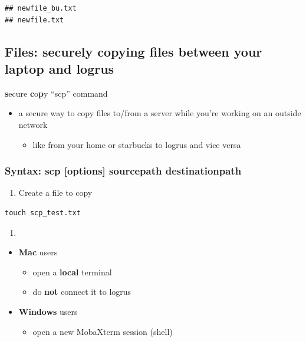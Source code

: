 \documentclass[
]{book}
\providecommand{\tightlist}{%
  \setlength{\itemsep}{0pt}\setlength{\parskip}{0pt}}
\begin{document}
\begin{verbatim}
## newfile_bu.txt
## newfile.txt
\end{verbatim}

\hypertarget{files-securely-copying-files-between-your-laptop-and-logrus}{%
\subsection{Files: securely copying files between your laptop and logrus}\label{files-securely-copying-files-between-your-laptop-and-logrus}}

\textbf{s}ecure \textbf{c}o\textbf{p}y ``scp'' command

\begin{itemize}
\tightlist
\item
  a secure way to copy files to/from a server while you're working on an outside network

  \begin{itemize}
  \tightlist
  \item
    like from your home or starbucks to logrus and vice versa
  \end{itemize}
\end{itemize}

\hypertarget{syntax-scp-options-sourcepath-destinationpath}{%
\subsubsection*{Syntax: scp {[}options{]} sourcepath destinationpath}\label{syntax-scp-options-sourcepath-destinationpath}}

\begin{enumerate}
\def\labelenumi{\arabic{enumi})}
\tightlist
\item
  Create a file to copy
\end{enumerate}

\begin{verbatim}
touch scp_test.txt
\end{verbatim}

\begin{enumerate}
\def\labelenumi{\arabic{enumi})}
\setcounter{enumi}{1}
\tightlist
\item
\end{enumerate}

\begin{itemize}
\tightlist
\item
  \textbf{Mac} users

  \begin{itemize}
  \tightlist
  \item
    open a \textbf{local} terminal
  \item
    do \textbf{not} connect it to logrus
  \end{itemize}
\item
  \textbf{Windows} users

  \begin{itemize}
  \tightlist
  \item
    open a new MobaXterm session (shell)
  \end{itemize}
\end{itemize}
\end{document}

